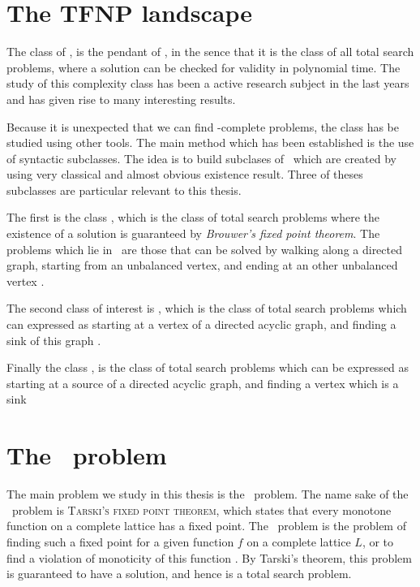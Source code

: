 \section{The TFNP landscape}

The class of \TFNP, is the pendant of \NP, in the sence that it is the class of all total search problems, where a solution can be checked for validity in polynomial time. The study of this complexity class has been a active research subject in the last years and has given rise to many interesting results.

Because it is unexpected that we can find \TFNP-complete problems, the class has be studied using other tools. The main method which has been established is the use of syntactic subclasses. The idea is to build subclases of \TFNP\ which are created by using very classical and almost obvious existence result. Three of theses subclasses are particular relevant to this thesis.

The first is the class \PPAD, which is the class of total search problems where the existence of a solution is guaranteed by \textit{Brouwer's fixed point theorem}. The problems which lie in \PPAD\ are those that can be solved by walking along a directed graph, starting from an unbalanced vertex, and ending at an other unbalanced vertex .

The second class of interest is \PLS, which is the class of total search problems which can expressed as starting at a vertex of a directed acyclic graph, and finding a sink of this graph .

Finally the class \EOPL, is the class of total search problems which can be expressed as starting at a source of a directed acyclic graph, and finding a vertex which is a sink 

\section{The \Tarski\ problem}

The main problem we study in this thesis is the \Tarski\ problem. The name sake of the \Tarski\ problem is \textsc{Tarski's fixed point theorem}, which states that every monotone function on a complete lattice has a fixed point. The \Tarski\ problem is the problem of finding such a fixed point for a given function $f$ on a complete lattice $L$, or to find a violation of monoticity of this function . By Tarski's theorem, this problem is guaranteed to have a solution, and hence is a total search problem.

